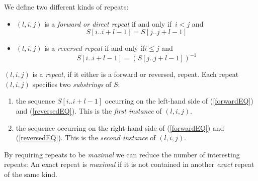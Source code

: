 \documentclass[12pt]{article}
\newcommand{\Iff}{if and only if\xspace}
\newcommand{\Substring}[3]{#1[#2..#3]}
\begin{document}
We define two different kinds of repeats:
\begin{itemize}
\item
\((l,i,j)\) is a \emph{forward or direct repeat} \Iff\ \(i<j\) and
\begin{equation}
\Substring{S}{i}{i+l-1}=\Substring{S}{j}{j+l-1}
\label{forwardEQ}
\end{equation}
\item
\((l,i,j)\) is a \emph{reversed repeat} \Iff \(i\leq j\) and
\begin{equation}
\Substring{S}{i}{i+l-1}=(\Substring{S}{j}{j+l-1})^{-1}
\label{reversedEQ}
\end{equation}
\end{itemize}
\((l,i,j)\) is a \emph{repeat}, if it either is a forward or reversed,
repeat. Each repeat \((l,i,j)\) specifies two \emph{substrings} of \(S\): 
\begin{enumerate}
\item
the sequence \(\Substring{S}{i}{i+l-1}\) occurring on the left-hand 
side of (\ref{forwardEQ}) and (\ref{reversedEQ}).
This is the \emph{first instance} of \((l,i,j)\).
\item
the sequence occurring on the right-hand 
side of (\ref{forwardEQ}) and (\ref{reversedEQ}).
This is the \emph{second instance} of \((l,i,j)\).
\end{enumerate}

By requiring repeats to be \emph{maximal} we can reduce the number of
interesting repeats:
An exact repeat is \emph{maximal} if it is not contained in another 
\emph{exact} repeat of the same kind. 
\end{document}

